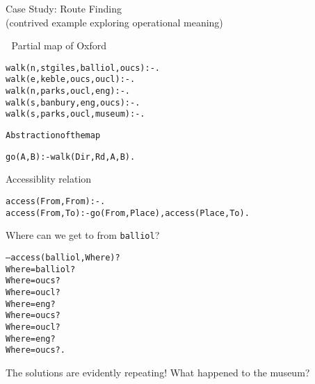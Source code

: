\documentclass{popl}
\def\user#1{{#1}}
\newenvironment{smalltt}{\begin{alltt}\smaller}{\end{alltt}}
\begin{document}
\begin{foil} 
\begin{cframed}[4.7in]
Case Study: Route Finding\\\smaller (contrived example exploring operational meaning)
\end{cframed} 

Partial map of Oxford
\begin{smalltt}
        walk(n, stgiles, balliol,   oucs)   :- .
        walk(e, keble,   oucs,      oucl)   :- .
        walk(n, parks,   oucl,      eng)    :- .
        walk(s, banbury, eng,       oucs)   :- .
        walk(s, parks,   oucl,      museum) :- .
\begin{smalltt}

Abstraction of the map
\end{smalltt}        
        go(A, B) :- walk(Dir, Rd, A, B).
\end{smalltt}

Accessiblity relation
\begin{smalltt}
        access(From, From) :- .
        access(From, To)   :- go(From, Place), access(Place, To).
\end{smalltt}

Where can we get to from {\tt balliol}?
\begin{smalltt}
-- \user{access(balliol, Where)?}
Where = balliol ? 
Where = oucs ? 
Where = oucl ? 
Where = eng ? 
Where = oucs ? 
Where = oucl ? 
Where = eng ? 
Where = oucs ? \user{.}
\end{smalltt}

The solutions are evidently repeating! What happened to the museum?
\end{foil}
\end{document}
